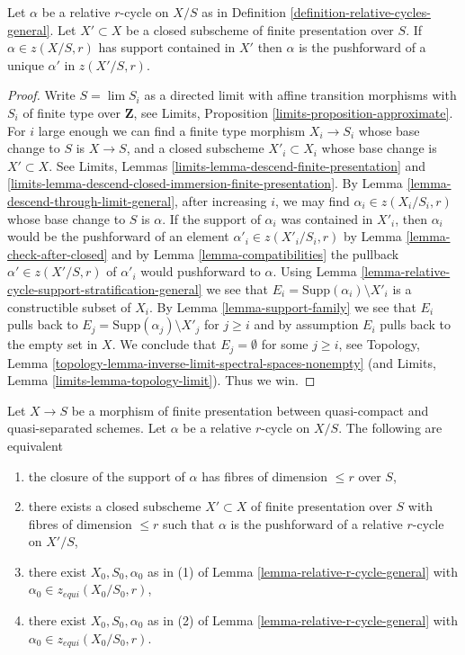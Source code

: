 \begin{lemma}
\label{lemma-supported-on-closed}
Let $\alpha$ be a relative $r$-cycle on $X/S$ as in
Definition \ref{definition-relative-cycles-general}.
Let $X' \subset X$ be a closed subscheme of finite presentation over $S$.
If $\alpha \in z(X/S, r)$ has support contained in $X'$
then $\alpha$ is the pushforward of a unique $\alpha'$
in $z(X'/S, r)$.
\end{lemma}

\begin{proof}
Write $S = \lim S_i$ as a directed limit with affine transition
morphisms with $S_i$ of finite type over $\mathbf{Z}$,
see Limits, Proposition \ref{limits-proposition-approximate}.
For $i$ large enough we can find a finite type morphism $X_i \to S_i$
whose base change to $S$ is $X \to S$, and a closed subscheme
$X'_i \subset X_i$ whose base change is $X' \subset X$. See
Limits, Lemmas
\ref{limits-lemma-descend-finite-presentation} and
\ref{limits-lemma-descend-closed-immersion-finite-presentation}.
By Lemma \ref{lemma-descend-through-limit-general},
after increasing $i$, we may find
$\alpha_i \in z(X_i/S_i, r)$ whose base change to $S$ is $\alpha$.
If the support of $\alpha_i$ was contained in $X'_i$,
then $\alpha_i$ would be the pushforward of an element
$\alpha'_i \in z(X'_i/S_i, r)$ by Lemma \ref{lemma-check-after-closed}
and by Lemma \ref{lemma-compatibilities}
the pullback $\alpha' \in z(X'/S, r)$ of $\alpha'_i$
would pushforward to $\alpha$. Using
Lemma \ref{lemma-relative-cycle-support-stratification-general} we see
that $E_i = \text{Supp}(\alpha_i) \setminus X'_i$ is a constructible subset
of $X_i$. By Lemma \ref{lemma-support-family}
we see that $E_i$ pulls back to $E_j = \text{Supp}(\alpha_j) \setminus X'_j$
for $j \geq i$ and by assumption $E_i$ pulls back to the empty set in $X$.
We conclude that $E_j = \emptyset$ for some $j \geq i$, see Topology, Lemma
\ref{topology-lemma-inverse-limit-spectral-spaces-nonempty}
(and Limits, Lemma \ref{limits-lemma-topology-limit}).
Thus we win.
\end{proof}

\begin{lemma}
\label{lemma-equidimensional-general}
Let $X \to S$ be a morphism of finite presentation between
quasi-compact and quasi-separated schemes. Let $\alpha$ be a
relative $r$-cycle on $X/S$. The following are equivalent
\begin{enumerate}
\item the closure of the support of $\alpha$ has fibres of dimension
$\leq r$ over $S$,
\item there exists a closed subscheme $X' \subset X$
of finite presentation over $S$ with fibres of dimension $\leq r$
such that $\alpha$ is the pushforward of a relative $r$-cycle on $X'/S$,
\item there exist $X_0, S_0, \alpha_0$ as in (1) of
Lemma \ref{lemma-relative-r-cycle-general}
with $\alpha_0 \in z_{equi}(X_0/S_0, r)$,
\item there exist $X_0, S_0, \alpha_0$ as in (2) of
Lemma \ref{lemma-relative-r-cycle-general}
with $\alpha_0 \in z_{equi}(X_0/S_0, r)$.
\end{enumerate}
\end{lemma}

